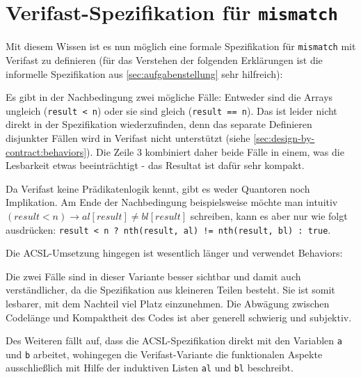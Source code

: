 \section{Verifast-Spezifikation für \texttt{mismatch}}

Mit diesem Wissen ist es nun möglich eine formale Spezifikation für \lstinline{mismatch} mit Verifast
zu definieren (für das Verstehen der folgenden Erklärungen ist die informelle Spezifikation aus 
\ref{sec:aufgabenstellung} sehr hilfreich):



Es gibt in der Nachbedingung zwei mögliche Fälle: Entweder sind die Arrays ungleich
(\lstinline{result < n}) oder sie sind gleich (\lstinline{result == n}). Das ist leider nicht direkt
in der Spezifikation wiederzufinden, denn das separate Definieren disjunkter Fällen wird in Verifast 
nicht unterstützt (siehe \ref{sec:design-by-contract:behaviors}). Die Zeile 3 kombiniert daher beide Fälle 
in einem, was die Lesbarkeit etwas beeinträchtigt - das Resultat ist dafür sehr kompakt.

Da Verifast keine Prädikatenlogik kennt, gibt es weder Quantoren noch Implikation. Am Ende der
Nachbedingung beispielsweise möchte man intuitiv \((result < n) \rightarrow al[result] \neq  bl[result]\)
schreiben, kann es aber nur wie folgt ausdrücken: 
\lstinline{result < n ? nth(result, al) != nth(result, bl) : true}.

Die ACSL-Umsetzung hingegen ist wesentlich länger und verwendet Behaviors:



Die zwei Fälle sind in dieser Variante besser sichtbar und damit auch verständlicher, da die Spezifikation
aus kleineren Teilen besteht. Sie ist somit lesbarer, mit dem Nachteil viel Platz einzunehmen.
Die Abwägung zwischen Codelänge und Kompaktheit des Codes ist aber generell schwierig und subjektiv.

Des Weiteren fällt auf, dass die ACSL-Spezifikation direkt mit den Variablen \lstinline{a} und
\lstinline{b} arbeitet, wohingegen die Verifast-Variante die funktionalen Aspekte ausschließlich
mit Hilfe der induktiven Listen \lstinline{al} und \lstinline{bl} beschreibt. 



